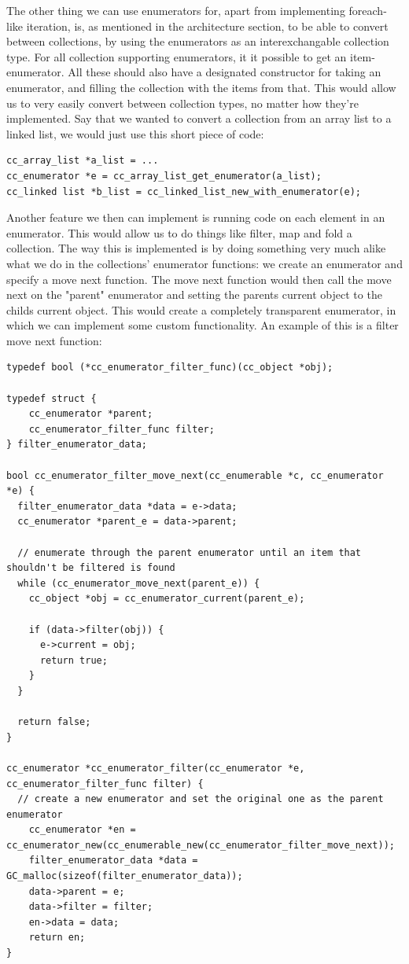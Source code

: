 \documentclass[table]{ituthesis}
\begin{document}
	The other thing we can use enumerators for, apart from implementing foreach-like iteration, is, as mentioned in the architecture section, to be able to convert between collections, by using the enumerators as an interexchangable collection type. For all collection supporting enumerators, it it possible to get an item-enumerator. All these should also have a designated constructor for taking an enumerator, and filling the collection with the items from that. This would allow us to very easily convert between collection types, no matter how they're implemented. Say that we wanted to convert a collection from an array list to a linked list, we would just use this short piece of code:

\begin{lstlisting}[label=cc_enumerator-new-with,caption=Creating collections with enumerators]
cc_array_list *a_list = ...
cc_enumerator *e = cc_array_list_get_enumerator(a_list);
cc_linked list *b_list = cc_linked_list_new_with_enumerator(e);
\end{lstlisting}

	Another feature we then can implement is running code on each element in an enumerator. This would allow us to do things like filter, map and fold a collection. The way this is implemented is by doing something very much alike what we do in the collections' enumerator functions: we create an enumerator and specify a move next function. The move next function would then call the move next on the "parent" enumerator and setting the parents current object to the childs current object. This would create a completely transparent enumerator, in which we can implement some custom functionality. An example of this is a filter move next function:
	
\begin{lstlisting}[label=cc_enumerator-filter-move_next,caption=Custom enumerator filter]
typedef bool (*cc_enumerator_filter_func)(cc_object *obj);

typedef struct {
	cc_enumerator *parent;
	cc_enumerator_filter_func filter;
} filter_enumerator_data;

bool cc_enumerator_filter_move_next(cc_enumerable *c, cc_enumerator *e) {
  filter_enumerator_data *data = e->data;
  cc_enumerator *parent_e = data->parent;

  // enumerate through the parent enumerator until an item that shouldn't be filtered is found
  while (cc_enumerator_move_next(parent_e)) {
    cc_object *obj = cc_enumerator_current(parent_e);
  
    if (data->filter(obj)) {
      e->current = obj;
      return true;
    }
  }

  return false;
}

cc_enumerator *cc_enumerator_filter(cc_enumerator *e, cc_enumerator_filter_func filter) {
  // create a new enumerator and set the original one as the parent enumerator
	cc_enumerator *en = cc_enumerator_new(cc_enumerable_new(cc_enumerator_filter_move_next));
	filter_enumerator_data *data = GC_malloc(sizeof(filter_enumerator_data));
	data->parent = e;
	data->filter = filter;
	en->data = data;
	return en;
}
\end{lstlisting}	    
\end{document}
